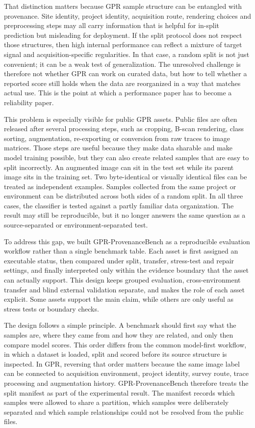 \documentclass[]{interact}
\begin{document}
That distinction matters because GPR sample structure can be entangled with provenance. Site identity, project identity, acquisition route, rendering choices and preprocessing steps may all carry information that is helpful for in-split prediction but misleading for deployment. If the split protocol does not respect those structures, then high internal performance can reflect a mixture of target signal and acquisition-specific regularities. In that case, a random split is not just convenient; it can be a weak test of generalization. The unresolved challenge is therefore not whether GPR can work on curated data, but how to tell whether a reported score still holds when the data are reorganized in a way that matches actual use. This is the point at which a performance paper has to become a reliability paper.

This problem is especially visible for public GPR assets. Public files are often released after several processing steps, such as cropping, B-scan rendering, class sorting, augmentation, re-exporting or conversion from raw traces to image matrices. Those steps are useful because they make data sharable and make model training possible, but they can also create related samples that are easy to split incorrectly. An augmented image can sit in the test set while its parent image sits in the training set. Two byte-identical or visually identical files can be treated as independent examples. Samples collected from the same project or environment can be distributed across both sides of a random split. In all three cases, the classifier is tested against a partly familiar data organization. The result may still be reproducible, but it no longer answers the same question as a source-separated or environment-separated test.

To address this gap, we built GPR-ProvenanceBench as a reproducible evaluation workflow rather than a single benchmark table. Each asset is first assigned an executable status, then compared under split, transfer, stress-test and repair settings, and finally interpreted only within the evidence boundary that the asset can actually support. This design keeps grouped evaluation, cross-environment transfer and blind external validation separate, and makes the role of each asset explicit. Some assets support the main claim, while others are only useful as stress tests or boundary checks.

The design follows a simple principle. A benchmark should first say what the samples are, where they came from and how they are related, and only then compare model scores. This order differs from the common model-first workflow, in which a dataset is loaded, split and scored before its source structure is inspected. In GPR, reversing that order matters because the same image label can be connected to acquisition environment, project identity, survey route, trace processing and augmentation history. GPR-ProvenanceBench therefore treats the split manifest as part of the experimental result. The manifest records which samples were allowed to share a partition, which samples were deliberately separated and which sample relationships could not be resolved from the public files.
\end{document}
